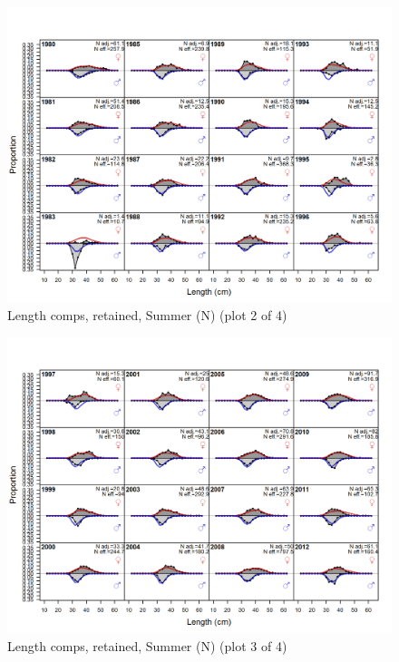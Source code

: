 \documentclass[12pt,]{article}
\begin{document}
\begin{figure}
\centering
\includegraphics{r4ss/plots_mod1/comp_lenfit_flt2mkt2_page2.png}
\caption{Length comps, retained, Summer (N) (plot 2 of 4)
\label{fig:length_fits}}
\end{figure}

\begin{figure}
\centering
\includegraphics{r4ss/plots_mod1/comp_lenfit_flt2mkt2_page3.png}
\caption{Length comps, retained, Summer (N) (plot 3 of 4)
\label{fig:length_fits}}
\end{figure}
\end{document}
